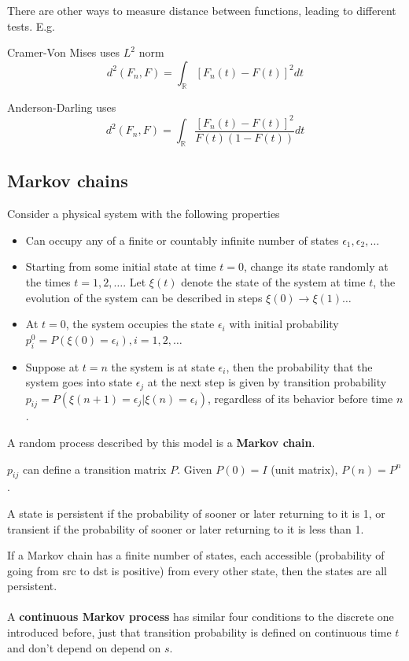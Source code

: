 \documentclass{article}
\begin{document}
There are other ways to measure distance between functions, leading to different tests.
E.g.

Cramer-Von Mises uses $L^2$ norm
$$
d^2(F_n, F) = \int_{\mathbb{R}} [F_n(t) - F(t)]^2 dt
$$

Anderson-Darling uses
$$
d^2(F_n, F) = \int_{\mathbb{R}} \frac{[F_n(t) - F(t)]^2}{F(t) (1 - F(t))} dt
$$

\subsection{Markov chains}

Consider a physical system with the following properties

\begin{itemize}
  \item Can occupy any of a finite or countably infinite number of states $\epsilon_1, \epsilon_2, \dots$
  \item Starting from some initial state at time $t = 0$, change its state randomly at the times $t = 1, 2, \dots$. Let $\xi(t)$ denote the state of the system at time $t$, the evolution of the system can be described in steps $\xi(0) \to \xi(1) \dots$
  \item At $t = 0$, the system occupies the state $\epsilon_i$ with initial probability $p^0_i = P(\xi(0) = \epsilon_i), i = 1, 2, \dots$
  \item Suppose at $t = n$ the system is at state $\epsilon_i$, then the probability that the system goes into state $\epsilon_j$ at the next step is given by transition probability $p_{ij} = P(\xi(n + 1) = \epsilon_j | \xi(n) = \epsilon_i)$, regardless of its behavior before time $n$.
\end{itemize}

A random process described by this model is a \textbf{Markov chain}.

$p_{ij}$ can define a transition matrix $P$.
Given $P(0) = I$ (unit matrix), $P(n) = P^n$.

A state is persistent if the probability of sooner or later returning to it is 1, or transient if the probability of sooner or later returning to it is less than 1.

If a Markov chain has a finite number of states, each accessible (probability of going from src to dst is positive) from every other state, then the states are all persistent.
\\
\\
A \textbf{continuous Markov process} has similar four conditions to the discrete one introduced before, just that transition probability is defined on continuous time $t$ and don't depend on depend on $s$.
\end{document}
